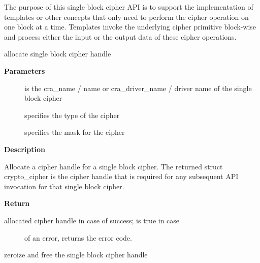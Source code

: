 \documentclass[a4paper,8pt,english]{sphinxmanual}
\begin{document}
The purpose of this single block cipher API is to support the implementation
of templates or other concepts that only need to perform the cipher operation
on one block at a time. Templates invoke the underlying cipher primitive
block-wise and process either the input or the output data of these cipher
operations.

\begin{fulllineitems}
\label{crypto/api-skcipher:c.crypto_alloc_cipher}
allocate single block cipher handle

\end{fulllineitems}


\textbf{Parameters}
\begin{description}
\item[{}] \leavevmode
is the cra\_name / name or cra\_driver\_name / driver name of the
single block cipher

\item[{}] \leavevmode
specifies the type of the cipher

\item[{}] \leavevmode
specifies the mask for the cipher

\end{description}

\textbf{Description}

Allocate a cipher handle for a single block cipher. The returned struct
crypto\_cipher is the cipher handle that is required for any subsequent API
invocation for that single block cipher.

\textbf{Return}
\begin{description}
\item[{allocated cipher handle in case of success;  is true in case}] \leavevmode
of an error,  returns the error code.

\end{description}

\begin{fulllineitems}
\label{crypto/api-skcipher:c.crypto_free_cipher}
zeroize and free the single block cipher handle

\end{fulllineitems}
\end{document}
